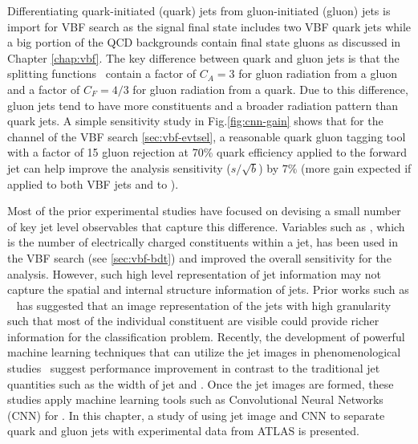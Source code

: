 Differentiating quark-initiated (quark) jets from gluon-initiated (gluon) jets is import for VBF \Hbb search as the signal final state includes two VBF quark jets while a big portion of the QCD backgrounds contain final state gluons as discussed in Chapter \ref{chap:vbf}. The key difference between quark and gluon jets is that the splitting functions~\cite{Altarelli:1977zs} contain a factor of $C_A=3$ for gluon radiation from a gluon and a factor of $C_F=4/3$ for gluon radiation from a quark. Due to this difference, gluon jets tend to have more constituents and a broader radiation pattern than quark jets. A simple sensitivity study in Fig.\ref{fig:cnn-gain} shows that for the \twocentral channel of the VBF \Hbb search \ref{sec:vbf-evtsel}, a reasonable quark gluon tagging tool with a factor of 15 gluon rejection at 70\% quark efficiency applied to the forward jet can help improve the analysis sensitivity ($s/\sqrt{b}$) by $7\%$ (more gain expected if applied to both VBF jets and to \fourcentral).

Most of the prior experimental studies have focused on devising a small number of key jet level observables that capture this difference. Variables such as \ntrk, which is the number of electrically charged constituents within a jet, has been used in the VBF \Hbb search (see \ref{sec:vbf-bdt}) and improved the overall sensitivity for the analysis. However, such high level representation of jet information may not capture the spatial and internal structure information of jets. Prior works such as ~\cite{deOliveira:2015xxd} has suggested that an image representation of the jets with high granularity such that most of the individual constituent are visible could provide richer information for the classification problem. Recently, the development of powerful machine learning techniques that can utilize the jet images in phenomenological studies~\cite{Komiske:2016rsd,Dery:2017fap} suggest \qgtagging performance improvement in contrast to the traditional jet quantities such as the width of jet and \ntrk. Once the jet images are formed, these studies apply machine learning tools such as Convolutional Neural Networks (CNN) for \qgtagging. In this chapter, a study of using jet image and CNN to separate quark and gluon jets with experimental data from ATLAS is presented. 


